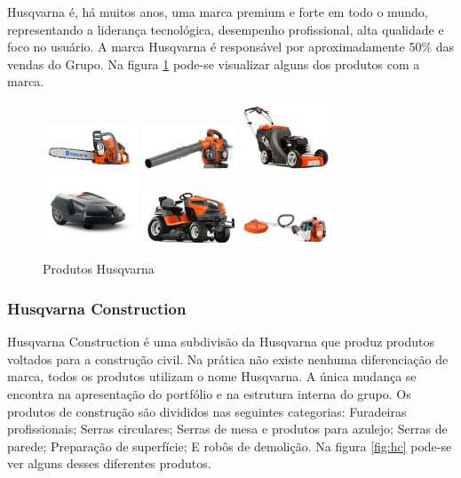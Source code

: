 \documentclass[12pt]{article}
\begin{document}
	Husqvarna é, há muitos anos, uma marca premium e forte em todo o mundo, representando a liderança tecnológica, desempenho profissional, alta qualidade e foco no usuário. A marca Husqvarna é responsável por aproximadamente 50\% das vendas do Grupo. Na figura \ref{fig:husq-prod} pode-se visualizar alguns dos produtos com a marca.

\begin{figure}[h!]
	\centering
	\includegraphics[width=0.25\textwidth]{img/products/husq4.png}
	\includegraphics[width=0.25\textwidth]{img/products/husq5.png}
	\includegraphics[width=0.25\textwidth]{img/products/husq2.png}
	\\
	\includegraphics[width=0.25\textwidth]{img/products/husq1.png}
	\includegraphics[width=0.25\textwidth]{img/products/husq3.png}
	\includegraphics[width=0.25\textwidth]{img/products/husq6.png}
	\caption{Produtos Husqvarna}
	\label{fig:husq-prod}
\end{figure}

\subsubsection{Husqvarna Construction}
	Husqvarna Construction é uma subdivisão da Husqvarna que produz produtos voltados para a construção civil. Na prática não existe nenhuma diferenciação de marca, todos os produtos utilizam o nome Husqvarna. A única mudança se encontra na apresentação do portfólio e na estrutura interna do grupo. Os produtos de construção são divididos nas seguintes categorias: Furadeiras profissionais; Serras circulares; Serras de mesa e produtos para azulejo; Serras de parede; Preparação de superfície; E robôs de demolição. Na figura \ref{fig:hc} pode-se ver alguns desses diferentes produtos.
\end{document}

